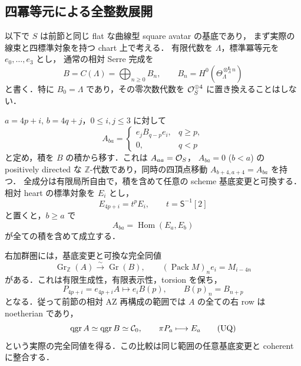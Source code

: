 \subsection{四冪等元による全整数展開}
\label{subsec:qa-relative-square-unfolding}

以下で $S$ は前節と同じ flat な曲線型 square avatar の基底であり，
まず実際の線束と四標準対象を持つ chart 上で考える．
有限代数を $\Lambda$，標準冪等元を $e_0,\ldots,e_3$ とし，
通常の相対 Serre 完成を
\[
 B=C(\Lambda)=\bigoplus_{n\ge0}B_n,
 \qquad B_n=H^0(\Theta_\Lambda^{\otimes_\Lambda^{\mathbf L}n})
\]
と書く．特に $B_0=\Lambda$ であり，その零次数代数を
$\mathcal O_S^{\oplus4}$ に置き換えることはしない．

\begin{proposition}
\label{prop:qa-relative-square-unfolding}
$a=4p+i$, $b=4q+j$，$0\le i,j\le3$ に対して
\[
 A_{ba}=
 \begin{cases}
 e_jB_{q-p}e_i,&q\ge p,\\
 0,&q<p
 \end{cases}
 \tag{UF}\label{eq:qa-square-unfolding-components}
\]
と定め，積を $B$ の積から移す．これは $A_{aa}=\mathcal O_S$，
$A_{ba}=0$ ($b<a$) の positively directed な
$\mathbb Z$-代数であり，同時の四頂点移動
$A_{b+4,a+4}=A_{ba}$ を持つ．
全成分は有限局所自由で，積を含めて任意の scheme 基底変更と可換する．
相対 heart の標準対象を $E_i$ とし，
\[
 E_{4p+i}=t^pE_i,\qquad t=\mathsf S^{-1}[2]
\]
と置くと，$b\ge a$ で
\[
 A_{ba}=\operatorname{Hom}(E_a,E_b)
\]
が全ての積を含めて成立する．

右加群圏には，基底変更と可換な完全同値
\[
 \operatorname{Gr}_{\mathbb Z}(A)\xrightarrow{\sim}
 \operatorname{Gr}(B),
 \qquad (\operatorname{Pack}M)_n e_i=M_{i-4n}
 \tag{PK}\label{eq:qa-square-packing}
\]
がある．これは有限生成性，有限表示性，torsion を保ち，
\[
 P_{4p+i}=e_{4p+i}A\longmapsto e_iB(p),
 \qquad B(p)_n=B_{n+p}
\]
となる．従って前節の相対 AZ 再構成の範囲では
$A$ の全ての右 row は noetherian であり，
\[
 \operatorname{qgr} A\simeq\operatorname{qgr} B\simeq\mathcal C_0,
 \qquad \pi P_a\longmapsto E_a
 \tag{UQ}\label{eq:qa-square-unfolded-heart}
\]
という実際の完全同値を得る．この比較は同じ範囲の任意基底変更と
coherent に整合する．
\end{proposition}
